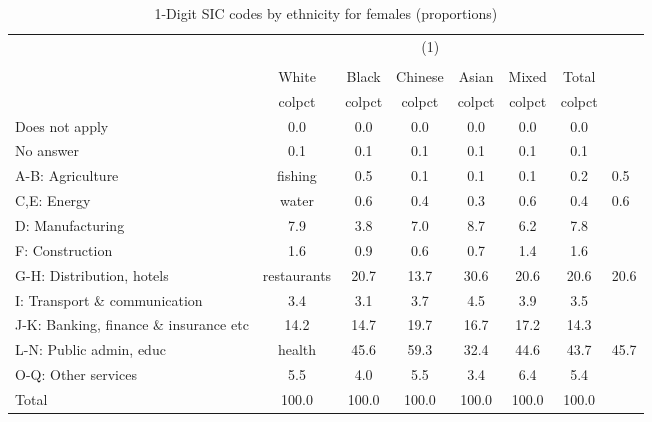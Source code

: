 \begin{table}[htbp]\centering
\def\sym#1{\ifmmode^{#1}\else\(^{#1}\)\fi}
\caption{1-Digit SIC codes by ethnicity for females (proportions)}
\begin{tabular}{l*{6}{c}}
\hline\hline
          &                                    \\
          &                                       \\
          &    White&    Black&  Chinese&    Asian&    Mixed&    Total\\
          &   colpct&   colpct&   colpct&   colpct&   colpct&   colpct\\
\hline
Does not apply&      0.0&      0.0&      0.0&      0.0&      0.0&      0.0\\
No answer &      0.1&      0.1&      0.1&      0.1&      0.1&      0.1\\
A-B: Agriculture & fishing&      0.5&      0.1&      0.1&      0.1&      0.2&      0.5\\
C,E: Energy & water&      0.6&      0.4&      0.3&      0.6&      0.4&      0.6\\
D: Manufacturing&      7.9&      3.8&      7.0&      8.7&      6.2&      7.8\\
F: Construction&      1.6&      0.9&      0.6&      0.7&      1.4&      1.6\\
G-H: Distribution, hotels & restaurants&     20.7&     13.7&     30.6&     20.6&     20.6&     20.6\\
I: Transport \& communication&      3.4&      3.1&      3.7&      4.5&      3.9&      3.5\\
J-K: Banking, finance \& insurance etc&     14.2&     14.7&     19.7&     16.7&     17.2&     14.3\\
L-N: Public admin, educ & health&     45.6&     59.3&     32.4&     44.6&     43.7&     45.7\\
O-Q: Other services&      5.5&      4.0&      5.5&      3.4&      6.4&      5.4\\
Total     &    100.0&    100.0&    100.0&    100.0&    100.0&    100.0\\
\hline\hline
\end{tabular}
\label{tab:1D_industries_female}
\end{table}
